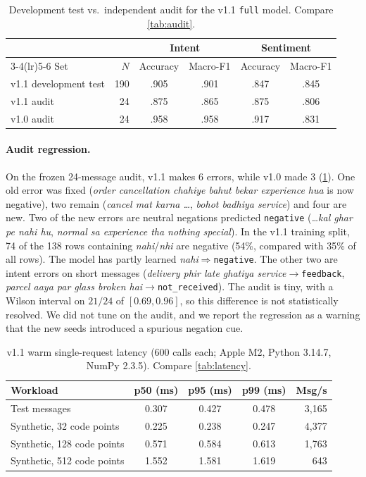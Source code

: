 \documentclass[11pt,a4paper]{article}
\theoremstyle{remark}
\newcommand{\lbl}[1]{\texttt{#1}}                      %
\newcommand{\hi}[1]{\textit{#1}}                       %
\begin{document}
\begin{table}[h]
\centering\small
\caption{Development test vs.\ independent audit for the v1.1 \lbl{full} model. Compare \cref{tab:audit}.}
\label{tab:v11audit}
\begin{tabular}{@{}l r cc cc@{}}
\toprule
& & \multicolumn{2}{c}{Intent} & \multicolumn{2}{c}{Sentiment}\\
\cmidrule(lr){3-4}\cmidrule(lr){5-6}
Set & $N$ & Accuracy & Macro-F1 & Accuracy & Macro-F1\\
\midrule
v1.1 development test & 190 &.905 &.901 &.847 &.845 \\
v1.1 audit            &  24 &.875 &.865 &.875 &.806 \\
\color{muted}v1.0 audit & \color{muted}24 & \color{muted}.958 & \color{muted}.958 & \color{muted}.917 & \color{muted}.831 \\
\bottomrule
\end{tabular}
\end{table}

\paragraph{Audit regression.} On the frozen 24-message audit, v1.1 makes 6
errors, while v1.0 made 3 (\cref{tab:v11audit}). One old error was fixed
(\hi{order cancellation chahiye bahut bekar experience hua} is now negative),
two remain (\hi{cancel mat karna \dots}, \hi{bohot badhiya service}) and four
are new. Two of the new errors are neutral negations predicted
\lbl{negative} (\hi{\dots kal ghar pe nahi hu}, \hi{normal sa experience tha
nothing special}). In the v1.1 training split, 74 of the 138 rows containing \hi{nahi}/\hi{nhi}
are negative (54\%, compared with 35\% of all rows). The model has partly
learned \hi{nahi}$\Rightarrow$\lbl{negative}. The other two are intent errors on short
messages (\hi{delivery phir late ghatiya service}$\to$\lbl{feedback},
\hi{parcel aaya par glass broken hai}$\to$\lbl{not\_received}). The audit is
tiny, with a Wilson interval on $21/24$ of $[0.69, 0.96]$, so this difference
is not statistically resolved. We did not tune on the audit, and we report
the regression as a warning that the new seeds introduced a spurious negation
cue.

\begin{table}[h]
\centering\small
\caption{v1.1 warm single-request latency (600 calls each; Apple M2, Python 3.14.7, NumPy 2.3.5). Compare \cref{tab:latency}.}
\label{tab:v11latency}
\begin{tabular}{@{}l cccr@{}}
\toprule
Workload & p50 (ms) & p95 (ms) & p99 (ms) & Msg/s \\
\midrule
Test messages                 & 0.307 & 0.427 & 0.478 & 3{,}165 \\
Synthetic, 32 code points     & 0.225 & 0.238 & 0.247 & 4{,}377 \\
Synthetic, 128 code points    & 0.571 & 0.584 & 0.613 & 1{,}763 \\
Synthetic, 512 code points    & 1.552 & 1.581 & 1.619 & 643 \\
\bottomrule
\end{tabular}
\end{table}
\end{document}
